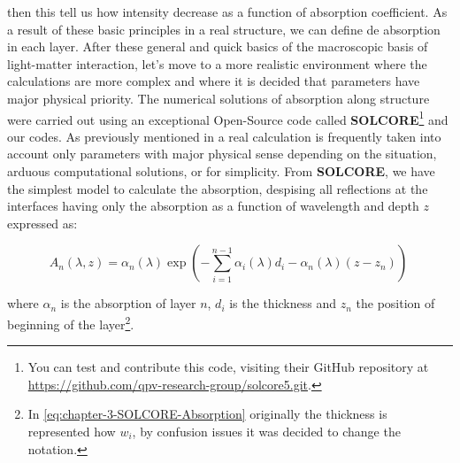 then this tell us how intensity decrease as a function of absorption coefficient.  As a result of these basic principles in a real structure, we can define de absorption in each layer. After these general and quick basics of the macroscopic basis of light-matter interaction, let's move to a more realistic environment where the calculations are more complex and where it is decided that parameters have major physical priority. The numerical solutions of absorption along structure were carried out using an exceptional Open-Source code called \textbf{SOLCORE}\cite{alonso2018solcore}\footnote{You can test and contribute this code, visiting their GitHub repository at \url{https://github.com/qpv-research-group/solcore5.git}. } and our codes. As previously mentioned in a real calculation is frequently taken into account only parameters with major physical sense depending on the situation, arduous computational solutions, or for simplicity. From \textbf{SOLCORE}, we have the simplest model to calculate the absorption, despising all reflections at the interfaces having only the absorption as a function of wavelength and depth $z$ expressed as: 


\begin{equation}
	A_{n}(\lambda,z) = \alpha_{n}(\lambda)\exp\left(-\sum\limits_{i=1}^{n-1}\alpha_{i}\left(\lambda\right)d_i-\alpha_{n}\left(\lambda\right)\left(z-z_{n}\right)\right)\
	\label{eq:chapter-3-SOLCORE-Absorption}
\end{equation}

where $\alpha_{n}$ is the absorption of layer $n$, $d_{i}$ is the thickness and $z_{n}$ the position of beginning of the layer\footnote{In \cref{eq:chapter-3-SOLCORE-Absorption} originally the thickness is represented how $w_i$, by confusion issues it was decided to change the notation.   }. 


